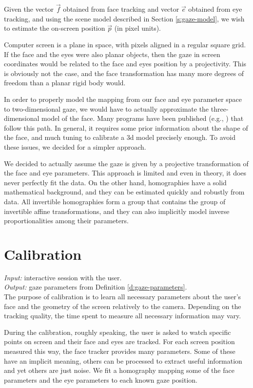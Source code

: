 Given the vector $\vec f$ obtained from face tracking and vector $\vec e$ obtained from eye tracking, and using the scene model described in Section \ref{s:gaze-model}, we wish to estimate the on-screen position $\vec p$ (in pixel units).

Computer screen is a plane in space, with pixels aligned in a regular square grid.
If the face and the eyes were also planar objects, then the gaze in screen coordinates would be related to the face and eyes position by a projectivity.
This is obviously not the case, and the face transformation has many more degrees of freedom than a planar rigid body would.
 
In order to properly model the mapping from our face and eye parameter space to two-dimensional gaze, we would have to actually approximate the three-dimensional model of the face.
Many programs have been published (e.g., \cite{fanelli11}) that follow this path.
In general, it requires some prior information about the shape of the face, and much tuning to calibrate a 3d model precisely enough.
To avoid these issues, we decided for a simpler approach.

We decided to actually assume the gaze is given by a projective transformation of the face and eye parameters.
This approach is limited and even in theory, it does never perfectly fit the data.
On the other hand, homographies have a solid mathematical background, and they can be estimated quickly and robustly from data.
All invertible homographies form a group that contains the group of invertible affine transformations, and they can also implicitly model inverse proportionalities among their parameters.



\section{Calibration}

\textit{Input:} interactive session with the user.\\
\textit{Output:} gaze parameters from Definition \ref{d:gaze-parameters}.\\

The purpose of calibration is to learn all necessary parameters about the user's face and the geometry of the screen relatively to the camera.
Depending on the tracking quality, the time spent to measure all necessary information may vary.

During the calibration, roughly speaking, the user is asked to watch specific points on screen and their face and eyes are tracked.
For each screen position measured this way, the face tracker provides many parameters.
Some of these have an implicit meaning, others can be processed to extract useful information and yet others are just noise.
We fit a homography mapping some of the face parameters and the eye parameters to each known gaze position.


